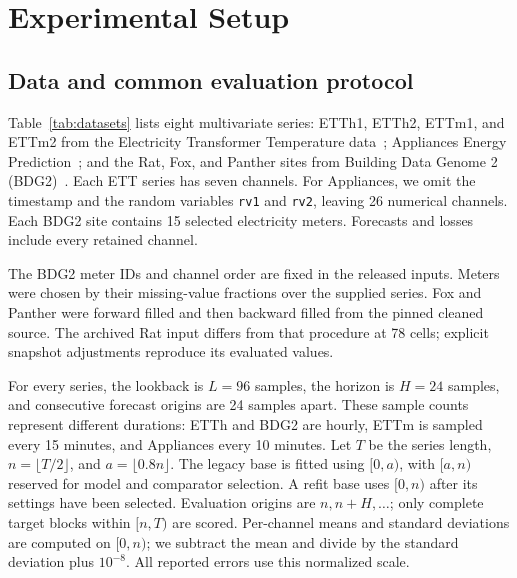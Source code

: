 \section{Experimental Setup}
\label{sec:experimental_setup}

\subsection{Data and common evaluation protocol}
Table~\ref{tab:datasets} lists eight multivariate series: ETTh1, ETTh2, ETTm1, and ETTm2 from the Electricity Transformer Temperature data~\cite{ettdata}; Appliances Energy Prediction~\cite{appliancesdata}; and the Rat, Fox, and Panther sites from Building Data Genome 2 (BDG2)~\cite{bdg2data}. Each ETT series has seven channels. For Appliances, we omit the timestamp and the random variables \texttt{rv1} and \texttt{rv2}, leaving 26 numerical channels. Each BDG2 site contains 15 selected electricity meters. Forecasts and losses include every retained channel.

The BDG2 meter IDs and channel order are fixed in the released inputs. Meters were chosen by their missing-value fractions over the supplied series. Fox and Panther were forward filled and then backward filled from the pinned cleaned source. The archived Rat input differs from that procedure at 78 cells; explicit snapshot adjustments reproduce its evaluated values.

For every series, the lookback is $L=96$ samples, the horizon is $H=24$ samples, and consecutive forecast origins are 24 samples apart. These sample counts represent different durations: ETTh and BDG2 are hourly, ETTm is sampled every 15 minutes, and Appliances every 10 minutes. Let $T$ be the series length, $n=\lfloor T/2\rfloor$, and $a=\lfloor0.8n\rfloor$. The legacy base is fitted using $[0,a)$, with $[a,n)$ reserved for model and comparator selection. A refit base uses $[0,n)$ after its settings have been selected. Evaluation origins are $n,n+H,\ldots$; only complete target blocks within $[n,T)$ are scored. Per-channel means and standard deviations are computed on $[0,n)$; we subtract the mean and divide by the standard deviation plus $10^{-8}$. All reported errors use this normalized scale.

\begin{table}[!t]
\caption{Prepared evaluation series. Eval. is the zero-based index of the first evaluation target; Blocks counts complete 24-sample targets. All eight series enter the same fixed-base comparison.}
\label{tab:datasets}
\centering

\end{table}

